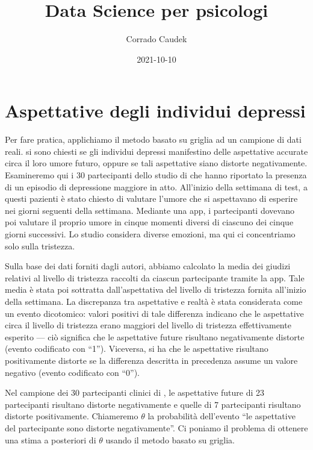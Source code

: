 \documentclass[
]{memoir}
\title{Data Science per psicologi}
\author{Corrado Caudek}
\date{2021-10-10}
\begin{document}
\maketitle

{
\hypersetup{linkcolor=}
\setcounter{tocdepth}{1}
\tableofcontents
}
\newpage

\vspace*{5cm}

\thispagestyle{empty}

\hypertarget{appendix-appendix}{%
\appendix}


\hypertarget{es-pratico-zetsche}{%
\chapter{Aspettative degli individui depressi}\label{es-pratico-zetsche}}

Per fare pratica, applichiamo il metodo basato su griglia ad un campione di dati reali. \citet{zetschefuture2019} si sono chiesti se gli individui depressi manifestino delle aspettative accurate circa il loro umore futuro, oppure se tali aspettative siano distorte negativamente. Esamineremo qui i 30 partecipanti dello studio di \citet{zetschefuture2019} che hanno riportato la presenza di un episodio di depressione maggiore in atto. All'inizio della settimana di test, a questi pazienti è stato chiesto di valutare l'umore che si aspettavano di esperire nei giorni seguenti della settimana. Mediante una app, i partecipanti dovevano poi valutare il proprio umore in cinque momenti diversi di ciascuno dei cinque giorni successivi. Lo studio considera diverse emozioni, ma qui ci concentriamo solo sulla tristezza.

Sulla base dei dati forniti dagli autori, abbiamo calcolato la media dei giudizi relativi al livello di tristezza raccolti da ciascun partecipante tramite la app. Tale media è stata poi sottratta dall'aspettativa del livello di tristezza fornita all'inizio della settimana. La discrepanza tra aspettative e realtà è stata considerata come un evento dicotomico: valori positivi di tale differenza indicano che le aspettative circa il livello di tristezza erano maggiori del livello di tristezza effettivamente esperito --- ciò significa che le aspettative future risultano negativamente distorte (evento codificato con ``1''). Viceversa, si ha che le aspettative risultano positivamente distorte se la differenza descritta in precedenza assume un valore negativo (evento codificato con ``0'').

Nel campione dei 30 partecipanti clinici di \citet{zetschefuture2019}, le aspettative future di 23 partecipanti risultano distorte negativamente e quelle di 7 partecipanti risultano distorte positivamente. Chiameremo \(\theta\) la probabilità dell'evento ``le aspettative del partecipante sono distorte negativamente''. Ci poniamo il problema di ottenere una stima a posteriori di \(\theta\) usando il metodo basato su griglia.
\end{document}

